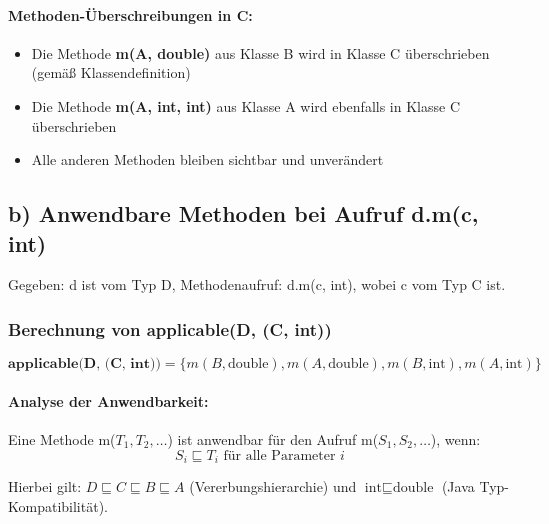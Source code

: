 \documentclass[11pt,a4paper]{article}
\begin{document}
\paragraph{Methoden-Überschreibungen in C:}
\begin{itemize}
    \item Die Methode \textbf{m(A, double)} aus Klasse B wird in Klasse C überschrieben (gemäß Klassendefinition)
    \item Die Methode \textbf{m(A, int, int)} aus Klasse A wird ebenfalls in Klasse C überschrieben
    \item Alle anderen Methoden bleiben sichtbar und unverändert
\end{itemize}

\subsection*{b) Anwendbare Methoden bei Aufruf d.m(c, int)}

Gegeben: d ist vom Typ D, Methodenaufruf: d.m(c, int), wobei c vom Typ C ist.

\subsubsection*{Berechnung von applicable(D, (C, int))}

\[
    \textbf{applicable(D, (C, int))} = \{m(B, \text{double}), m(A, \text{double}), m(B, \text{int}), m(A, \text{int})\}
\]

\paragraph{Analyse der Anwendbarkeit:}

Eine Methode m($T_1, T_2, \ldots$) ist anwendbar für den Aufruf m($S_1, S_2, \ldots$), wenn:
$$S_i \sqsubseteq T_i \text{ für alle Parameter } i$$

Hierbei gilt: $D \sqsubseteq C \sqsubseteq B \sqsubseteq A$ (Vererbungshierarchie)
und $\text{int} \sqsubseteq \text{double}$ (Java Typ-Kompatibilität).
\end{document}

